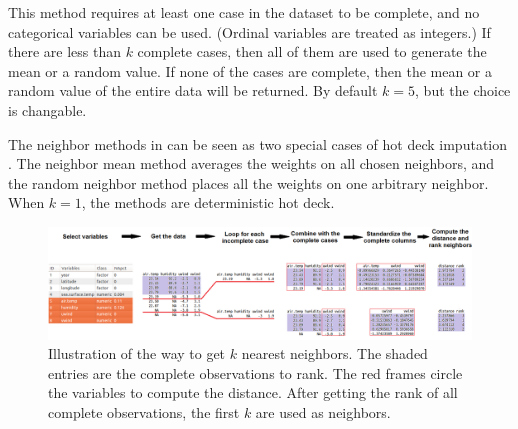 \documentclass[article]{jss}
\begin{document}
This method requires at least one case in the dataset to be complete, and no categorical variables can be used. (Ordinal variables are treated as integers.) If there are less than $k$ complete cases, then all of them are used to generate the mean or a random value. If none of the cases are complete, then the mean or a random value of the entire data will be returned. By default $k=5$, but the choice is changable.


The neighbor methods in  can be seen as two special cases of hot deck imputation \citep{andridge2010review}. The neighbor mean method averages the weights on all chosen neighbors, and the random neighbor method places all the weights on one arbitrary neighbor. When $k=1$, the methods are deterministic hot deck.

\begin{center}
\begin{figure}[h]
\begin{centering}
\includegraphics[width=1\textwidth]{graph/fig9-diagram}
\par\end{centering}
\caption{Illustration of the way to get $k$ nearest neighbors. The shaded entries are the complete observations to rank. The red frames circle the variables to compute the distance. After getting the rank of all complete observations, the first $k$ are used as neighbors. }
\label{fig:neighbor-diagram}
\end{figure}
\par\end{center}
\end{document}
